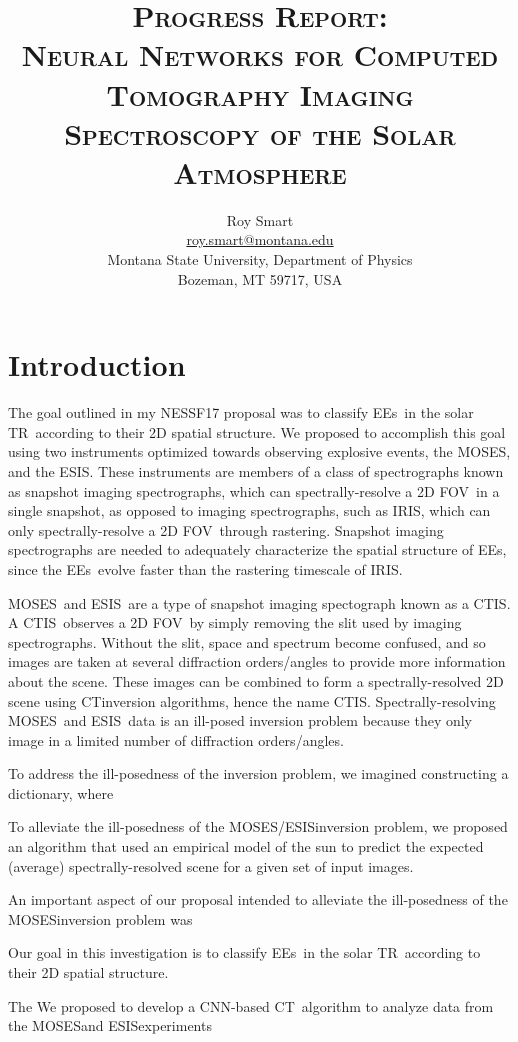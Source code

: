 \documentclass[10pt,letterpaper]{article}
\title{\textsc{Progress Report: \\ Neural Networks for Computed Tomography Imaging Spectroscopy of the Solar Atmosphere}}
\author{Roy Smart \\ \url{roy.smart@montana.edu} \\ Montana State University, Department of Physics \\ Bozeman, MT 59717, USA}
\newcommand{\TR}{\ac{TR}}
\newcommand{\EEs}{\acp{EE}}
\newcommand{\CT}{\ac{CT}}
\newcommand{\CTIS}{\ac{CTIS}}
\newcommand{\MOSES}{\ac{MOSES}}
\newcommand{\ESIS}{\ac{ESIS}}
\newcommand{\FOV}{\ac{FOV}}
\newcommand{\CNN}{\ac{CNN}}
\newcommand{\IRIS}{\ac{IRIS}}
\begin{document}
	
	\maketitle
	
	\section{Introduction}
	
		The goal outlined in my NESSF17 proposal was to classify \EEs\ in the solar \TR\ according to their 2D spatial structure.
		We proposed to accomplish this goal using two instruments optimized towards observing explosive events, the \MOSES, and the \ESIS.
		These instruments are members of a class of spectrographs known as snapshot imaging spectrographs, which can spectrally-resolve a 2D \FOV\ in a single snapshot, as opposed to imaging spectrographs, such as IRIS, which can only spectrally-resolve a 2D \FOV\ through rastering.
		Snapshot imaging spectrographs are needed to adequately characterize the spatial structure of \EEs, since the \EEs\ evolve faster than the rastering timescale of \IRIS.
		
		\MOSES\ and \ESIS\ are a type of snapshot imaging spectograph known as a \CTIS.
		A \CTIS\ observes a 2D \FOV\ by simply removing the slit used by imaging spectrographs.
		Without the slit, space and spectrum become confused, and so images are taken at several diffraction orders/angles to provide more information about the scene.
		These images can be combined to form a spectrally-resolved 2D scene using \CT inversion algorithms, hence the name \CTIS.
		Spectrally-resolving \MOSES\ and \ESIS\ data is an ill-posed inversion problem because they only image in a limited number of diffraction orders/angles.
		
		To address the ill-posedness of the inversion problem, we imagined constructing a dictionary, where 
		
		To alleviate the ill-posedness of the \MOSES/\ESIS inversion problem, we proposed an algorithm that used an empirical model of the sun to predict the expected (average) spectrally-resolved scene for a given set of input images.
		
		An important aspect of our proposal intended to alleviate the ill-posedness of the \MOSES inversion problem was 
		
		Our goal in this investigation is to classify \EEs\ in the solar \TR\ according to their 2D spatial structure.
		
		The 
		We proposed to develop a \CNN-based \CT\ algorithm to analyze data from the \MOSES and \ESIS experiments
		
\end{document}
